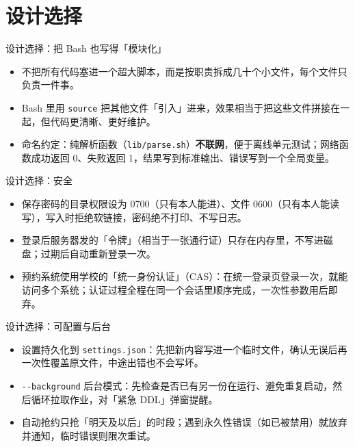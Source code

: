 \documentclass[aspectratio=169]{beamer}
\begin{document}
\section{设计选择}

\begin{frame}{设计选择：把 Bash 也写得「模块化」}
  \begin{itemize}
    \setlength\itemsep{0.7em}
    \item 不把所有代码塞进一个超大脚本，而是按职责拆成几十个小文件，每个文件只负责一件事。
    \item Bash 里用 \texttt{source} 把其他文件「引入」进来，效果相当于把这些文件拼接在一起，但代码更清晰、更好维护。
    \item 命名约定：纯解析函数（\texttt{lib/parse.sh}）\textbf{不联网}，便于离线单元测试；网络函数成功返回 0、失败返回 1，结果写到标准输出、错误写到一个全局变量。
  \end{itemize}
\end{frame}

\begin{frame}{设计选择：安全}
  \begin{itemize}
    \setlength\itemsep{0.7em}
    \item 保存密码的目录权限设为 0700（只有本人能进）、文件 0600（只有本人能读写），写入时拒绝软链接，密码绝不打印、不写日志。
    \item 登录后服务器发的「令牌」（相当于一张通行证）只存在内存里，不写进磁盘；过期后自动重新登录一次。
    \item 预约系统使用学校的「统一身份认证」（CAS）：在统一登录页登录一次，就能访问多个系统；认证过程全程在同一个会话里顺序完成，一次性参数用后即弃。
  \end{itemize}
\end{frame}

\begin{frame}{设计选择：可配置与后台}
  \begin{itemize}
    \setlength\itemsep{0.7em}
    \item 设置持久化到 \texttt{settings.json}：先把新内容写进一个临时文件，确认无误后再一次性覆盖原文件，中途出错也不会写坏。
    \item \texttt{-{}-background} 后台模式：先检查是否已有另一份在运行、避免重复启动，然后循环拉取作业，对「紧急 DDL」弹窗提醒。
    \item 自动抢约只抢「明天及以后」的时段；遇到永久性错误（如已被禁用）就放弃并通知，临时错误则限次重试。
  \end{itemize}
\end{frame}
\end{document}
